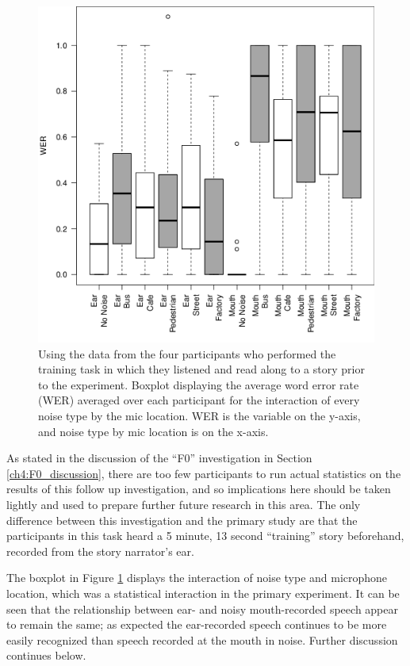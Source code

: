 \documentclass[dissertation,copyright]{uathesis}
\makeatletter
\def\maxwidth{ %
  \ifdim\Gin@nat@width>\linewidth
    \linewidth
  \else
    \Gin@nat@width
  \fi
}
\makeatother
\begin{document}
\begin{figure}[h!]

\includegraphics[width=\maxwidth]{figure/perc_boxplot_noiseXmic-1} 

\caption{Using the data from the four participants who performed the training task in which they listened and read along to a story prior to the experiment. Boxplot displaying the average word error rate (WER) averaged over each participant for the interaction of every noise type by the mic location. WER is the variable on the y-axis, and noise type by mic location is on the x-axis.}
\label{fig:perc_noiseXmic_boxplot}
\end{figure}

As stated in the discussion of the ``F0'' investigation in Section \ref{ch4:F0_discussion}, there are too few participants to run actual statistics on the results of this follow up investigation, and so implications here should be taken lightly and used to prepare further future research in this area. The only difference between this investigation and the primary study are that the participants in this task heard a 5 minute, 13 second ``training'' story beforehand, recorded from the story narrator's ear.

The boxplot in Figure \ref{fig:perc_noiseXmic_boxplot} displays the interaction of noise type and microphone location, which was a statistical interaction in the primary experiment.  It can be seen that the relationship between ear- and noisy mouth-recorded speech appear to remain the same; as expected the ear-recorded speech continues to be more easily recognized than speech recorded at the mouth in noise.  Further discussion continues below.
\end{document}
